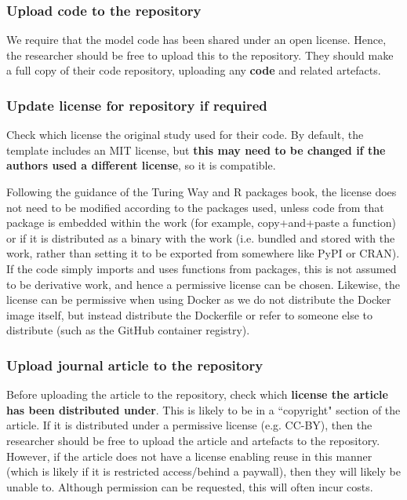 \vspace{0.5cm}
\subsubsection{Upload code to the repository}

We require that the model code has been shared under an open license. Hence, the researcher should be free to upload this to the repository. They should make a full copy of their code repository, uploading any \textbf{code} and related artefacts.

\vspace{0.5cm}
\subsubsection{Update license for repository if required}

Check which license the original study used for their code. By default, the template includes an MIT license, but \textbf{this may need to be changed if the authors used a different license}, so it is compatible.

Following the guidance of the Turing Way\autocite{the_turing_way_community_turing_2022} and R packages book,\autocite{wickham_12_2023} the license does not need to be modified according to the packages used, unless code from that package is embedded within the work (for example, copy+and+paste a function) or if it is distributed as a binary with the work (i.e. bundled and stored with the work, rather than setting it to be exported from somewhere like PyPI or CRAN). If the code simply imports and uses functions from packages, this is not assumed to be derivative work, and hence a permissive license can be chosen. Likewise, the license can be permissive when using Docker\autocite{merkel_docker_2014} as we do not distribute the Docker image itself, but instead distribute the Dockerfile or refer to someone else to distribute (such as the GitHub container registry).\autocite{the_linux_foundation_docker_nodate}

\vspace{0.5cm}
\subsubsection{Upload journal article to the repository}

Before uploading the article to the repository, check which \textbf{license the article has been distributed under}. This is likely to be in a ``copyright" section of the article. If it is distributed under a permissive license (e.g. CC-BY), then the researcher should be free to upload the article and artefacts to the repository. However, if the article does not have a license enabling reuse in this manner (which is likely if it is restricted access/behind a paywall), then they will likely be unable to. Although permission can be requested, this will often incur costs.


